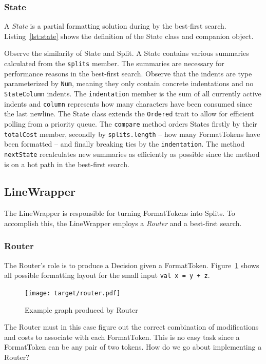 \subsubsection{State}
A \emph{State} is a partial formatting solution during by the best-first search.
Listing~\ref{lst:state} shows the definition of the State class and companion object.
\begin{minipage}{\linewidth}
  
\end{minipage}
Observe the similarity of State and Split.
A State contains various summaries calculated from the \texttt{splits} member.
The summaries are necessary for performance reasons in the best-first search.
Observe that the indents are type parameterized by \texttt{Num}, meaning they only contain concrete indentations and no \texttt{StateColumn} indents.
The \texttt{indentation} member is the sum of all currently active indents and \texttt{column} represents how many characters have been consumed since the last newline.
The State class extends the \texttt{Ordered} trait to allow for efficient polling from a priority queue.
The \texttt{compare} method orders States firstly by their \texttt{totalCost} member, secondly by \texttt{splits.length} -- how many FormatTokens have been formatted -- and finally breaking ties by the \texttt{indentation}.
The method \texttt{nextState} recalculates new summaries as efficiently as possible since the method is on a hot path in the best-first search.

\subsection{LineWrapper}
The LineWrapper is responsible for turning FormatTokens into Splits.
To accomplish this, the LineWrapper employs a \emph{Router} and a best-first search.

\subsubsection{Router}\label{sec:router}
The Router's role is to produce a Decision given a FormatToken.
Figure~\ref{fig:router} shows all possible formatting layout for the small input \texttt{val x = y + z}.
\begin{figure}
  \centering
  \texttt{[image: target/router.pdf]}
  \caption{Example graph produced by Router}
  \label{fig:router}
\end{figure}
The Router must in this case figure out the correct combination of modifications and costs to associate with each FormatToken.
This is no easy task since a FormatToken can be any pair of two tokens.
How do we go about implementing a Router?

